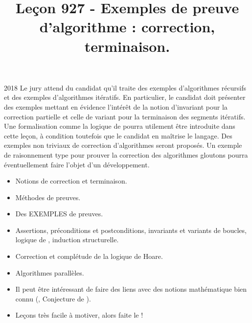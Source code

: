 \documentclass{agregfiche}
\title{Leçon 927 - Exemples de preuve d’algorithme :  correction, terminaison.}
\begin{document}
\maketitle

\secrapports
\begin{rapport}{2018}
    Le jury attend du candidat qu’il traite des exemples d’algorithmes récursifs et des exemples d’algorithmes itératifs.
    En particulier, le candidat doit présenter des exemples mettant en évidence l’intérêt de la notion
    d’invariant pour la correction partielle et celle de variant pour la terminaison des segments itératifs.
    Une formalisation comme la logique de  pourra utilement être introduite dans cette leçon, à
    condition toutefois que le candidat en maîtrise le langage. Des exemples non triviaux de correction
    d’algorithmes seront proposés. Un exemple de raisonnement type pour prouver la correction des algorithmes gloutons pourra éventuellement faire l’objet d’un développement.
\end{rapport}

\secindispensables

\begin{itemize}
	\item Notions de correction et terminaison.
    \item Méthodes de preuves.
    \item Des EXEMPLES de preuves.
\end{itemize}

\secasavoir

\begin{itemize}
	\item Assertions, préconditions et
    postconditions, invariants et variants de boucles, logique de , induction structurelle.
\end{itemize}

\secidees

\begin{itemize}
	\item Correction et complétude de la logique de Hoare.
    \item Algorithmes parallèles.
\end{itemize}

\secpieges

\begin{itemize}
	\item Il peut être intéressant de faire des liens avec des 
	notions mathématique bien connu (, Conjecture de 
	).
    \item Leçons très facile à motiver, alors faite le !
\end{itemize}
\end{document}
